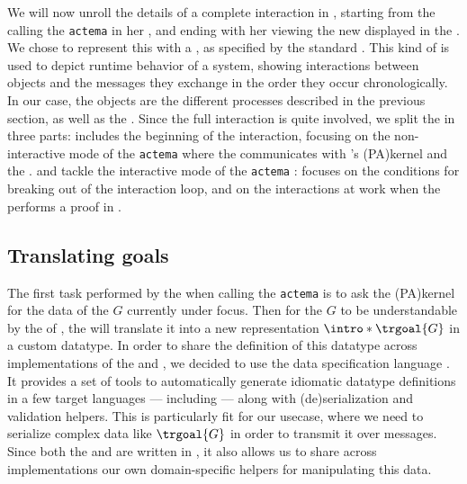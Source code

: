 \AP
We will now unroll the details of a complete interaction in ,
starting from the  calling the \texttt{actema}  in her
, and ending with her viewing the new  displayed in
the . We chose to represent this with a ,
as specified by the  standard \cite{enwiki:1153944336}. This kind of
 is used to depict runtime behavior of a system, showing
interactions between objects and the messages they exchange in the order they
occur chronologically. In our case, the objects are the different processes
described in the previous section, as well as the . Since the full
interaction is quite involved, we split the  in three parts:
 includes the beginning of the interaction, focusing on the
non-interactive mode of the \texttt{actema}  where the
 communicates with 's \kl(PA){kernel} and the
.  and  tackle the
interactive mode of the \texttt{actema} :  focuses
on the conditions for breaking out of the interaction loop, and
 on the interactions at work when the  performs
a proof  in .

\subsection{Translating goals}

\AP
The first task performed by the  when calling the
\texttt{actema}  is to ask the \kl(PA){kernel} for the data of the
 $G$ currently under focus. Then for the  $G$ to be
understandable by the  of , the 
will translate it into a new representation $\intro*\trgoal{G}$ in a custom datatype.
In order to share the definition of this datatype across implementations of the
 and , we decided to use the  data
specification language \cite{ATD}. It provides a set of tools to automatically
generate idiomatic datatype definitions in a few target languages --- including
 --- along with (de)serialization and validation helpers. This is
particularly fit for our usecase, where we need to serialize complex data like
$\trgoal{G}$ in order to transmit it over  messages. Since both the
 and  are written in , it also allows
us to share across implementations our own domain-specific helpers for
manipulating this data.

